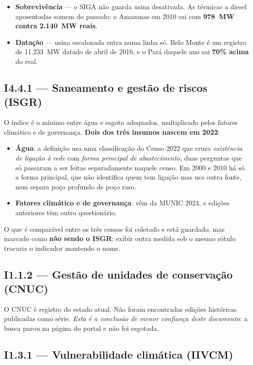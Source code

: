 \documentclass[11pt,a4paper]{article}
\begin{document}
\begin{itemize}
  \item \textbf{Sobrevivência} --- o SIGA não guarda usina desativada. As térmicas a
    diesel aposentadas somem do passado: o Amazonas em 2010 sai com \textbf{978~MW
    contra 2.140~MW reais}.
  \item \textbf{Datação} --- usina escalonada entra numa linha só. Belo Monte é um
    registro de 11.233~MW datado de abril de 2016, e o Pará daquele ano sai
    \textbf{70\% acima} do real.
\end{itemize}

\subsection*{I4.4.1 --- Saneamento e gestão de riscos (ISGR)}

O índice é o mínimo entre água e esgoto adequados, multiplicado pelos fatores climático
e de governança. \textbf{Dois dos três insumos nascem em 2022}:

\begin{itemize}
  \item \textbf{Água}: a definição usa uma classificação do Censo 2022 que cruza
    \emph{existência de ligação à rede} com \emph{forma principal de abastecimento},
    duas perguntas que só passaram a ser feitas separadamente naquele censo. Em 2000 e
    2010 há só a forma principal, que não identifica quem tem ligação mas usa outra
    fonte, nem separa poço profundo de poço raso.
  \item \textbf{Fatores climático e de governança}: vêm da MUNIC 2024, e edições
    anteriores têm outro questionário.
\end{itemize}

O que \emph{é} comparável entre os três censos foi coletado e está guardado, mas
marcado como \textbf{não sendo o ISGR}: exibir outra medida sob o mesmo rótulo trocaria
o indicador mantendo o nome.

\subsection*{I1.1.2 --- Gestão de unidades de conservação (CNUC)}

O CNUC é registro do estado atual. Não foram encontradas edições históricas publicadas
como série. \emph{Esta é a conclusão de menor confiança deste documento}: a busca parou
na página do portal e não foi esgotada.

\subsection*{I1.3.1 --- Vulnerabilidade climática (IIVCM)}
\end{document}
